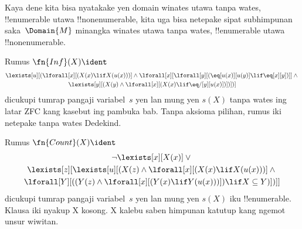 \documentclass[../../../include/open-logic-section]{subfiles}
\begin{document}


\begin{explain}
Kaya dene kita bisa nyatakake yen domain winates utawa tanpa
wates, !!{enumerable} utawa !!{nonenumerable}, kita uga bisa
netepake sipat subhimpunan saka~$\Domain{M}$ minangka winates
utawa tanpa wates, !!{enumerable} utawa !!{nonenumerable}.
\end{explain}

\begin{prop}
Rumus $\fn{Inf}(X) \ident$
\begin{multline*}
\lexists[u][(\lforall[x][(X(x) \lif X(u(x)))] \land {}
    \lforall[x][\lforall[y][(\eq[u(x)][u(y)] \lif
      \eq[x][y])]] \land {} \\
    \lexists[y][(X(y) \land \lforall[x][(X(x)
      \lif \eq/[y][u(x)])])])]
\end{multline*}
dicukupi tumrap pangaji variabel~$s$ yen lan mung yen
$s(X)$ tanpa wates ing latar ZFC kang kasebut ing pambuka bab. Tanpa aksioma pilihan, rumus iki netepake tanpa wates Dedekind.
\end{prop}

\begin{prop}
Rumus $\fn{Count}(X) \ident $
\begin{multline*}
\lnot\lexists[x][X(x)] \lor {} \\
\lexists[z][\lexists[u][(X(z) \land
    \lforall[x][(X(x) \lif X(u(x)))] \land {} \\
    \lforall[Y][((Y(z) \land
      \lforall[x][(Y(x) \lif Y(u(x)))]) \lif X \subseteq Y)])]]
\end{multline*}
dicukupi tumrap pangaji variabel~$s$ yen lan mung yen
$s(X)$ iku !!{enumerable}. Klausa iki nyakup X kosong. X kalebu saben himpunan katutup kang ngemot unsur wiwitan.
\end{prop}
\end{document}
